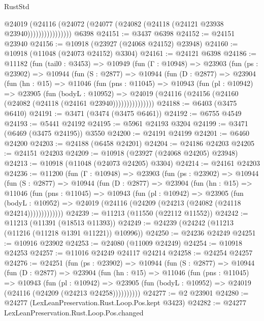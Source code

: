 \begin{lexlean}{RustStd}
\begin{coremodule}
{{{{{{{{{{{{{{{{{{{                      @24019
                        (@24116
                          (@24072 (@24077 (@24082 (@24118 (@24121 @23938 @23940))))))))))))))))
    @6398
@24151 := @3437 @6398
@24152 := @24151 @23940
@24156 := @10918 (@23927 (@24068 @24152) @23948)
@24160 := @10918 (@11048 (@24073 @24152) @3304)
@24161 := @24121 @6398
@24186 := @11182
    (fun (tail0 : @3453) =>
    @10949
      (fun (Γ : @10948) =>
      @23903
        (fun (ps : @23902) =>
        @10944
          (fun (S : @2877) =>
          @10944
            (fun (D : @2877) =>
            @23904
              (fun (hn : @15) =>
              @11046
                (fun (pns : @11045) =>
                @10943
                  (fun (pl : @10942) =>
                  @23905
                    (fun (bodyL : @10952) =>
                    @24019 (@24116 (@24156 (@24160 (@24082 (@24118 (@24161 @23940)))))))))))))))
@24188 := @6403 (@3475 @6410)
@24191 := @3471 (@3474 (@3475 @6461))
@24192 := @6755 @4549
@24193 := @5441 @24192
@24195 := @5961 @24193 @3204
@24199 := @3471 (@6469 (@3475 @24195)) @3550
@24200 := @24191 @24199
@24201 := @6460 @24200
@24203 := @24188 (@6458 @24201)
@24204 := @24186 @24203
@24205 := @24151 @24203
@24209 := @10918 (@23927 (@24068 @24205) @23948)
@24213 := @10918 (@11048 (@24073 @24205) @3304)
@24214 := @24161 @24203
@24236 := @11200
    (fun (Γ : @10948) =>
    @23903
      (fun (ps : @23902) =>
      @10944
        (fun (S : @2877) =>
        @10944
          (fun (D : @2877) =>
          @23904
            (fun (hn : @15) =>
            @11046
              (fun (pns : @11045) =>
              @10943
                (fun (pl : @10942) =>
                @23905
                  (fun (bodyL : @10952) =>
                  @24019 (@24116 (@24209 (@24213 (@24082 (@24118 @24214)))))))))))))
@24239 := @11213 (@11550 (@22112 @11552))
@24242 := @11213 (@11391 (@18513 @11393))
@24249 := @24239 (@24242 (@11213 (@11216 (@11218 @1391 @11221)) @10996))
@24250 := @24236 @24249
@24251 := @10916 @23902
@24253 := @24080 (@11009 @24249)
@24254 := @10918 @24253
@24257 := @11016 @24249 @24117 @24214
@24258 := @24254 @24257
@24276 := @24251
    (fun (ps : @23902) =>
    @10944
      (fun (S : @2877) =>
      @10944
        (fun (D : @2877) =>
        @23904
          (fun (hn : @15) =>
          @11046
            (fun (pns : @11045) =>
            @10943
              (fun (pl : @10942) =>
              @23905 (fun (bodyL : @10952) => @24019 (@24116 (@24209 (@24213 @24258))))))))))
@24277 := @2 @23901
@24280 := @24277 (LexLeanPreservation.Rust.Loop.Pos.kept @3423)
@24282 := @24277 LexLeanPreservation.Rust.Loop.Pos.changed
}}}}}}}}}}}}}}}}}}}
\end{coremodule}
\end{lexlean}
